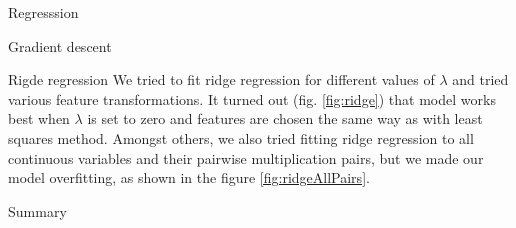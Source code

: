 \documentclass{article}
\begin{document}
\begin{section}{Regresssion}
\begin{subsection}{Gradient descent}
\end{subsection}
\begin{subsection}{Rigde regression}
We tried to fit ridge regression for different values of $\lambda$ and tried various feature transformations. It turned out (fig. \ref{fig:ridge}) that model works best when $\lambda$ is set to zero and features are chosen the same way as with least squares method. Amongst others, we also tried fitting ridge regression to all continuous variables and their pairwise multiplication pairs, but we made our model overfitting, as shown in the figure \ref{fig:ridgeAllPairs}.
\begin{figure}[!h]
\center
{}
\hfill
\caption{}
\end{figure}
\end{subsection}
\begin{subsection}{Summary}
\end{subsection}
\end{section}
\end{document}
